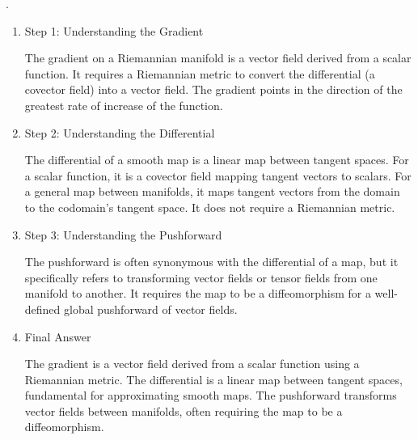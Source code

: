 \documentclass[10pt,a4paper]{report}
\begin{document}
 \begin{remark}.
 
 \begin{enumerate}
 \item Step 1: Understanding the Gradient

The gradient on a Riemannian manifold is a vector field derived from a scalar function. It requires a Riemannian metric to convert the differential (a covector field) into a vector field. The gradient points in the direction of the greatest rate of increase of the function.

\item Step 2: Understanding the Differential

The differential of a smooth map is a linear map between tangent spaces. For a scalar function, it is a covector field mapping tangent vectors to scalars. For a general map between manifolds, it maps tangent vectors from the domain to the codomain's tangent space. It does not require a Riemannian metric.

\item Step 3: Understanding the Pushforward

The pushforward is often synonymous with the differential of a map, but it specifically refers to transforming vector fields or tensor fields from one manifold to another. It requires the map to be a diffeomorphism for a well-defined global pushforward of vector fields.

\item Final Answer

The gradient is a vector field derived from a scalar function using a Riemannian metric. The differential is a linear map between tangent spaces, fundamental for approximating smooth maps. The pushforward transforms vector fields between manifolds, often requiring the map to be a diffeomorphism.

\end{enumerate}
 \end{remark}
 
\end{document}
